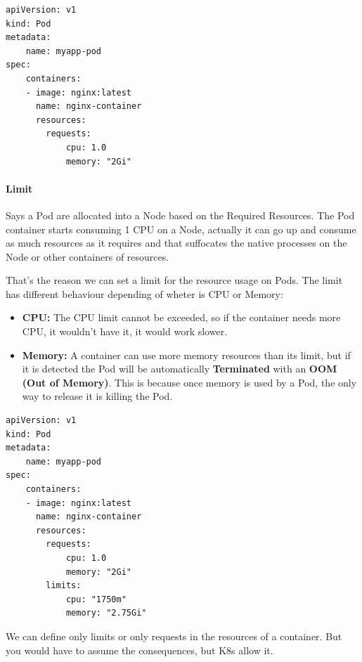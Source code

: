 \documentclass{article}
\newenvironment{blocktemplateII}[1]{%
    \tcolorbox[beamer,%
    noparskip,breakable,
    colframe=Green,%
    colbacklower=LimeGreen!75!LightGreen,%
    title=#1]}%
    {\endtcolorbox}
\newenvironment{codetemplate}[1][]{%
  \mybasecolorbox[#1]
  \itshape
}{%
  \endmybasecolorbox
}
\begin{document}
\begin{codetemplate}{}
\begin{verbatim}
apiVersion: v1
kind: Pod
metadata:
    name: myapp-pod
spec:
    containers:
    - image: nginx:latest
      name: nginx-container
      resources:
        requests:
            cpu: 1.0
            memory: "2Gi"
\end{verbatim}
\end{codetemplate}

\paragraph{Limit}

Says a Pod are allocated into a Node based on the Required Resources. The Pod container starts consuming 1 CPU on a Node, actually it can go up and consume as much resources as it requires and that suffocates the native processes on the Node or other containers of resources.

That's the reason we can set a limit for the resource usage on Pods. The limit has different behaviour depending of wheter is CPU or Memory:
\begin{itemize}
    \item \textbf{CPU:} The CPU limit cannot be exceeded, so if the container needs more CPU, it wouldn't have it, it would work slower.
    \item \textbf{Memory:} A container can use more memory resources than its limit, but if it is detected the Pod will be automatically \textbf{Terminated} with an \textbf{OOM (Out of Memory)}. This is because once memory is used by a Pod, the only way to release it is killing the Pod.
\end{itemize}

\begin{codetemplate}{}
\begin{verbatim}
apiVersion: v1
kind: Pod
metadata:
    name: myapp-pod
spec:
    containers:
    - image: nginx:latest
      name: nginx-container
      resources:
        requests:
            cpu: 1.0
            memory: "2Gi"
        limits:
            cpu: "1750m"
            memory: "2.75Gi"
\end{verbatim}
\end{codetemplate}

\begin{blocktemplateII}{NOTE}
We can define only limits or only requests in the resources of a container. But you would have to assume the consequences, but K8s allow it.
\end{blocktemplateII}
\end{document}
